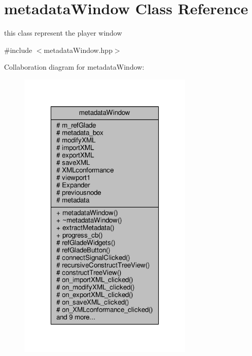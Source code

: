 \hypertarget{classmetadataWindow}{\section{metadata\-Window Class Reference}
\label{classmetadataWindow}
}


this class represent the player window  




{\ttfamily \#include $<$metadata\-Window.\-hpp$>$}



Collaboration diagram for metadata\-Window\-:\nopagebreak
\begin{figure}[H]
\begin{center}
\leavevmode
\includegraphics[width=238pt]{classmetadataWindow__coll__graph}
\end{center}
\end{figure}
